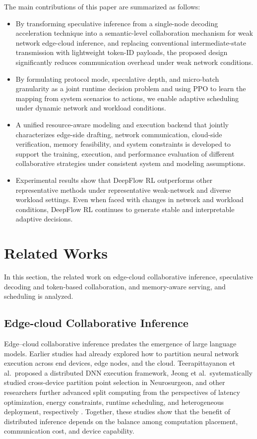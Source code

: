 \documentclass[a4paper,fleqn]{cas-dc}
\begin{document}
The main contributions of this paper are summarized as follows:
\begin{itemize}
    \item By transforming speculative inference from a single-node decoding acceleration technique into a semantic-level collaboration mechanism for weak network edge-cloud inference, and replacing conventional intermediate-state transmission with lightweight token-ID payloads, the proposed design significantly reduces communication overhead under weak network conditions.

    \item By formulating protocol mode, speculative depth, and micro-batch granularity as a joint runtime decision problem and using PPO to learn the mapping from system scenarios to actions, we enable adaptive scheduling under dynamic network and workload conditions.
    
    \item A unified resource-aware modeling and execution backend that jointly characterizes edge-side drafting, network communication, cloud-side verification, memory feasibility, and system constraints is developed to support the training, execution, and performance evaluation of different collaborative strategies under consistent system and modeling assumptions.

    \item Experimental results show that DeepFlow RL outperforms other representative methods under representative weak-network and diverse workload settings. Even when faced with changes in network and workload conditions, DeepFlow RL continues to generate stable and interpretable adaptive decisions.
\end{itemize}

\section{Related Works}
In this section, the related work on edge-cloud collaborative inference, speculative decoding and token-based collaboration, and memory-aware serving, and scheduling is analyzed.

\subsection{Edge-cloud Collaborative Inference}
Edge--cloud collaborative inference predates the emergence of large language models. Earlier studies had already explored how to partition neural network execution across end devices, edge nodes, and the cloud. Teerapittayanon et al.\ proposed a distributed DNN execution framework, Jeong et al.\ systematically studied cross-device partition point selection in Neurosurgeon, and other researchers further advanced split computing from the perspectives of latency optimization, energy constraints, runtime scheduling, and heterogeneous deployment, respectively \cite{teerapittayanon2017distributed_dnn,kang2017neurosurgeon,li2020edge_ai,eshratifar2021jointdnn,laskaridis2020spinn,huang2022aodnn}. Together, these studies show that the benefit of distributed inference depends on the balance among computation placement, communication cost, and device capability.
\end{document}
